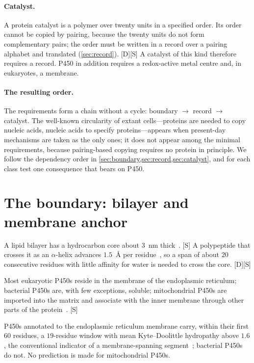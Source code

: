 \documentclass[10pt,twocolumn,a4paper]{article}
\newcommand{\D}{\textsf{[D]}}
\newcommand{\Sup}{\textsf{[S]}}
\begin{document}
\paragraph{Catalyst.}
A protein catalyst is a polymer over twenty units in a specified order. Its
order cannot be copied by pairing, because the twenty units do not form
complementary pairs; the order must be written in a record over a pairing
alphabet and translated (\cref{sec:record}). \D\Sup{} A catalyst of this kind
therefore requires a record. P450 in addition requires a redox-active metal
centre and, in eukaryotes, a membrane.

\paragraph{The resulting order.}
The requirements form a chain without a cycle: boundary $\to$ record $\to$
catalyst. The well-known circularity of extant cells---proteins are needed to
copy nucleic acids, nucleic acids to specify proteins---appears when
present-day mechanisms are taken as the only ones; it does not appear among
the minimal requirements, because pairing-based copying requires no protein
in principle. We follow the dependency order in
\cref{sec:boundary,sec:record,sec:catalyst}, and for each class test one
consequence that bears on P450.

\section{The boundary: bilayer and membrane anchor}
\label{sec:boundary}

A lipid bilayer has a hydrocarbon core about $3$~nm thick~\citep{white1999}.
\Sup{} A polypeptide that crosses it as an $\alpha$-helix advances
$1.5$~\AA{} per residue~\citep{pauling1951}, so a span of about $20$
consecutive residues with little affinity for water is needed to cross the
core. \D\Sup

Most eukaryotic P450s reside in the membrane of the endoplasmic reticulum;
bacterial P450s are, with few exceptions, soluble; mitochondrial P450s are
imported into the matrix and associate with the inner membrane through other
parts of the protein~\citep{black1992,williams2000,omura2006}. \Sup

\begin{prediction}
\label{pred:anchor}
P450s annotated to the endoplasmic reticulum membrane carry, within their
first $60$ residues, a $19$-residue window with mean Kyte--Doolittle
hydropathy above $1.6$, the conventional indicator of a membrane-spanning
segment~\citep{kyte1982}; bacterial P450s do not. No prediction is made for
mitochondrial P450s.
\end{prediction}
\end{document}
